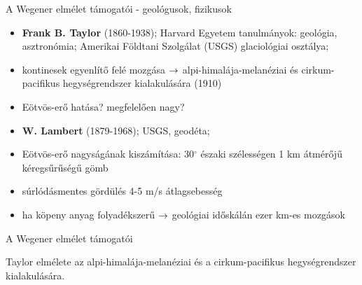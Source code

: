 \documentclass{beamer}
\begin{document}
\begin{frame}{A Wegener elmélet támogatói - geológusok, fizikusok}
    \begin{itemize}
        \item \textbf{Frank B. Taylor} (1860-1938); Harvard Egyetem tanulmányok: geológia, asztronómia; Amerikai Földtani Szolgálat (USGS) glaciológiai osztálya;
        \item kontinesek egyenlítő felé mozgása $\rightarrow$ alpi-himalája-melanéziai és cirkum-pacifikus hegységrendszer kialakulására (1910)
        \item Eötvös-erő hatása? megfelelően nagy?
    \end{itemize}
    
    \begin{itemize}
        \item \textbf{W. Lambert} (1879-1968); USGS, geodéta;
        \item Eötvös-erő nagyságának kiszámítása: 30$^\circ$ északi szélességen 1 km átmérőjű kéregsűrűségű gömb
        \item súrlódásmentes gördülés 4-5 m/s átlagsebesség
        \item ha köpeny anyag folyadékszerű $\rightarrow$ geológiai időskálán ezer km-es mozgások
    \end{itemize}        
\end{frame}


\begin{frame}{A Wegener elmélet támogatói}
    \begin{center}
    \begin{minipage}[c]{0.9\textwidth}
        \centering
        
        Taylor elmélete az alpi-himalája-melanéziai és a cirkum-pacifikus hegységrendszer kialakulására.
    \end{minipage}
    \end{center}
\end{frame}
\end{document}
